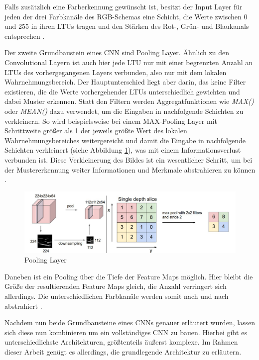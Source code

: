Falls zusätzlich eine Farberkennung gewünscht ist, besitzt der Input Layer für jeden der drei Farbkanäle des RGB-Schemas eine Schicht, die Werte zwischen 0 und 255 in ihren LTUs tragen und den Stärken des Rot-, Grün- und Blaukanals entsprechen \cite{AurelienGeron.2018}.

Der zweite Grundbaustein eines CNN sind Pooling Layer. Ähnlich zu den Convolutional Layern ist auch hier jede LTU nur mit einer begrenzten Anzahl an LTUs des vorhergegangenen Layers verbunden, also nur mit dem lokalen Wahrnehmungsbereich. Der Hauptunterschied liegt aber darin, das keine Filter existieren, die die Werte vorhergehender LTUs unterschiedlich gewichten und dabei Muster erkennen. Statt den Filtern werden Aggregatfunktionen wie \textit{MAX()} oder \textit{MEAN()} dazu verwendet, um die Eingaben in nachfolgende Schichten zu verkleinern. So wird beispielsweise bei einem MAX-Pooling Layer mit Schrittweite größer als 1 der jeweils größte Wert des lokalen Wahrnehmungsbereiches weitergereicht und damit die  Eingabe in nachfolgende Schichten verkleinert (siehe Abbildung \ref{pooling_layer}), was mit einem Informationsverlust verbunden ist. Diese Verkleinerung des Bildes ist ein wesentlicher Schritt, um bei der Mustererkennung weiter Informationen und Merkmale abstrahieren zu können \cite{AurelienGeron.2018}.

\begin{figure}[ht]
	\begin{center}
		\includegraphics[width=15cm]{Bilder/pooling_layer.png} 
		\caption[Pooling Layer]{Pooling Layer \cite{LeonadroAraujoSantos.2018}}
		\label{pooling_layer}
	\end{center}
\end{figure}

Daneben ist ein Pooling über die Tiefe der Feature Maps möglich. Hier bleibt die Größe der resultierenden Feature Maps gleich, die Anzahl verringert sich allerdings. Die unterschiedlichen Farbkanäle werden somit nach und nach abstrahiert \cite{AurelienGeron.2018}.

Nachdem nun beide Grundbausteine eines CNNs genauer erläutert wurden, lassen sich diese nun kombinieren um ein vollständiges CNN zu bauen. Hierbei gibt es unterschiedlichste Architekturen, größtenteils äußerst komplexe. Im Rahmen dieser Arbeit genügt es allerdings, die grundlegende Architektur zu erläutern.

